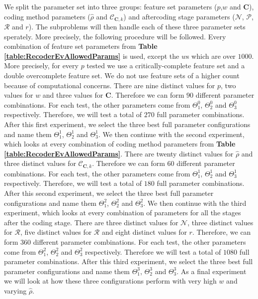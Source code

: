 \documentclass[12pt,a4paper,oneside,english]{UPBThesis}
\begin{document}
We split the parameter set into three groups: feature set parameters ($p$,$w$ and $\textbf{C}$), coding method parameters ($\hat{\rho}$ and $\mathcal{C}_{\textbf{C},k}$) and aftercoding stage parameters ($\mathcal{N}$, $\mathcal{P}$, $\mathcal{R}$ and $r$). The subproblems will then handle each of these three parameter sets sperately. More precisely, the following procedure will be followed. Every combination of feature set parameters from \textbf{Table \ref{table:RecoderEvAllowedParams}} is used, except the $w$s which are over $1000$. More precisely, for every $p$ tested we use a critically-complete feature set and a double overcomplete feature set. We do not use feature sets of a higher count because of computational concerns. There are nine distinct values for $p$, two values for $w$ and three values for \textbf{C}. Therefore we can form $90$ different parameter combinations. For each test, the other parameters come from $\Theta_1^0$, $\Theta_2^0$ and $\Theta_3^0$ respectively. Therefore, we will test a total of $270$ full parameter combinations. After this first experiment, we select the three best full parameter configurations and name them $\Theta_1^1$, $\Theta_2^1$ and $\Theta_3^1$. We then continue with the second experiment, which looks at every combination of coding method parameters from \textbf{Table \ref{table:RecoderEvAllowedParams}}. There are twenty distinct values for $\hat{\rho}$ and three distinct values for $\mathcal{C}_{\textbf{C},k}$. Therefore we can form $60$ different parameter combinations. For each test, the other parameters come from $\Theta_1^1$, $\Theta_2^1$ and $\Theta_3^1$ respectively. Therefore, we will test a total of $180$ full parameter combinations. After this second experiment, we select the three best full parameter configurations and name them $\Theta_1^2$, $\Theta_2^2$ and $\Theta_3^2$. We then continue with the third experiment, which looks at every combination of parameters for all the stages after the coding stage. There are three distinct values for $\mathcal{N}$, three distinct values for $\mathcal{R}$, five distinct values for $\mathcal{R}$ and eight distinct values for $r$. Therefore, we can form $360$ different parameter combinations. For each test, the other parameters come from $\Theta_1^2$, $\Theta_2^2$ and $\Theta_3^2$ respectively. Therefore we will test a total of $1080$ full parameter combinations. After this third experiment, we select the three best full parameter configurations and name them $\Theta_1^3$, $\Theta_2^3$ and $\Theta_3^3$. As a final experiment we will look at how these three configurations perform with very high $w$ and varying $\hat{\rho}$.
\end{document}
